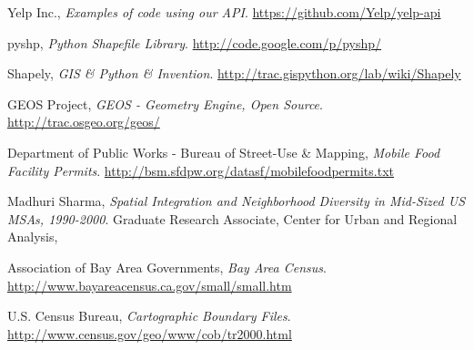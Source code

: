 \documentclass[11pt,twocolumn]{article}
\begin{document}
\begin{thebibliography}{9}

  Yelp Inc.,
  \emph{Examples of code using our API}.
  \url{https://github.com/Yelp/yelp-api}

  pyshp,
  \emph{Python Shapefile Library}.
  \url{http://code.google.com/p/pyshp/}

  Shapely,
  \emph{GIS \& Python \& Invention}.
  \url{http://trac.gispython.org/lab/wiki/Shapely}

  GEOS Project,
  \emph{GEOS - Geometry Engine, Open Source}.
  \url{http://trac.osgeo.org/geos/}

  Department of Public Works - Bureau of Street-Use \& Mapping,
  \emph{Mobile Food Facility Permits}.
  \url{http://bsm.sfdpw.org/datasf/mobilefoodpermits.txt}

  Madhuri Sharma,
  \emph{Spatial Integration and Neighborhood Diversity in Mid-Sized US MSAs, 1990-2000}.
  Graduate Research Associate,
  Center for Urban and Regional Analysis,

  Association of Bay Area Governments,
  \emph{Bay Area Census}.
  \url{http://www.bayareacensus.ca.gov/small/small.htm}

  U.S. Census Bureau,
  \emph{Cartographic Boundary Files}.
  \url{http://www.census.gov/geo/www/cob/tr2000.html}

\end{thebibliography}
\end{document}
